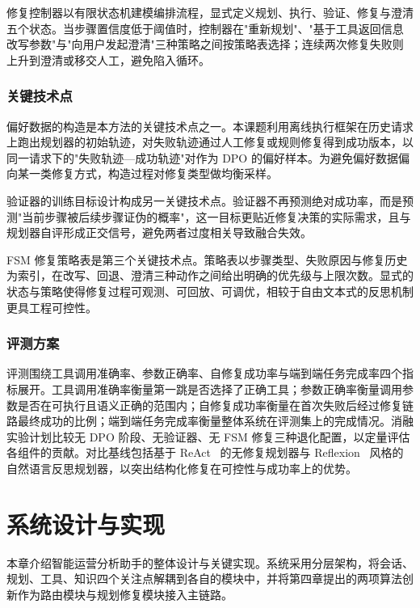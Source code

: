 修复控制器以有限状态机建模编排流程，显式定义规划、执行、验证、修复与澄清五个状态。当步骤置信度低于阈值时，控制器在"重新规划"、"基于工具返回信息改写参数"与"向用户发起澄清"三种策略之间按策略表选择；连续两次修复失败则上升到澄清或移交人工，避免陷入循环。

\subsection{关键技术点}

偏好数据的构造是本方法的关键技术点之一。本课题利用离线执行框架在历史请求上跑出规划器的初始轨迹，对失败轨迹通过人工修复或规则修复得到成功版本，以同一请求下的"失败轨迹—成功轨迹"对作为 DPO 的偏好样本。为避免偏好数据偏向某一类修复方式，构造过程对修复类型做均衡采样。

验证器的训练目标设计构成另一关键技术点。验证器不再预测绝对成功率，而是预测"当前步骤被后续步骤证伪的概率"，这一目标更贴近修复决策的实际需求，且与规划器自评形成正交信号，避免两者过度相关导致融合失效。

FSM 修复策略表是第三个关键技术点。策略表以步骤类型、失败原因与修复历史为索引，在改写、回退、澄清三种动作之间给出明确的优先级与上限次数。显式的状态与策略使得修复过程可观测、可回放、可调优，相较于自由文本式的反思机制更具工程可控性。

\subsection{评测方案}

评测围绕工具调用准确率、参数正确率、自修复成功率与端到端任务完成率四个指标展开。工具调用准确率衡量第一跳是否选择了正确工具；参数正确率衡量调用参数是否在可执行且语义正确的范围内；自修复成功率衡量在首次失败后经过修复链路最终成功的比例；端到端任务完成率衡量整体系统在评测集上的完成情况。消融实验计划比较无 DPO 阶段、无验证器、无 FSM 修复三种退化配置，以定量评估各组件的贡献。对比基线包括基于 ReAct~\cite{react} 的无修复规划器与 Reflexion~\cite{reflexion} 风格的自然语言反思规划器，以突出结构化修复在可控性与成功率上的优势。


\chapter{系统设计与实现}

本章介绍智能运营分析助手的整体设计与关键实现。系统采用分层架构，将会话、规划、工具、知识四个关注点解耦到各自的模块中，并将第四章提出的两项算法创新作为路由模块与规划修复模块接入主链路。

